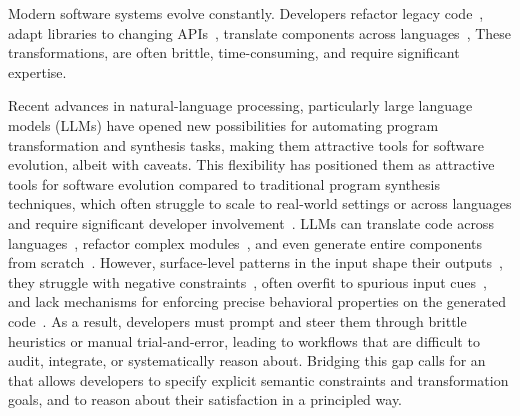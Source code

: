 \documentclass[sigplan,review,anonymous,10pt]{acmart}
\begin{document}



Modern software systems evolve constantly.
Developers refactor legacy code~\cite{Fowler99,Mens04,facebook2010redesigns,dropbox2014syncengine},
adapt libraries to changing APIs~\cite{dig2005role,kula2017empiricalstudyimpactrefactoring},
translate components across languages~\cite{manzoor_cli_python,gaultier_rewrite_cpp},
These transformations, are often brittle, time-consuming, and require significant expertise.

Recent advances in natural-language processing, particularly large language
models (LLMs) have opened new possibilities for automating program
transformation and synthesis tasks,
making them attractive tools for software
evolution, albeit with caveats.
This flexibility has positioned them as attractive tools for software evolution
compared to traditional program synthesis techniques, which often struggle
to scale to real-world settings or across languages and require significant developer involvement~\cite{reynolds2019syguscomp,leino2016dafny,wu2023programming,dynamoth2016,cambronero2019active}.
LLMs can translate code across languages~\cite{ou2025enhancingllmbasedcodetranslation},
refactor complex modules~\cite{ziftci2025migrating},
and even generate entire components from scratch~\cite{huynh2025largelanguagemodelscode}.
However, surface-level patterns in the input shape their outputs~\cite{yang2025evaluatinggeneralizationcapabilitieslarge},
they struggle with negative constraints~\cite{hwang2024thinkpinkelephant,jiang2024llmsdreamelephantswhen},
often overfit to spurious input cues~\cite{xu2023llmfoolitselfpromptbased, wu2023deceptpromptexploitingllmdrivencode},
and lack mechanisms for enforcing precise behavioral properties on the generated code~\cite{roh2025breakthechainreasoningfailuresllms}.
As a result, developers must prompt and steer them through brittle heuristics or manual trial-and-error, leading to workflows that are difficult to audit, integrate, or systematically reason about.
Bridging this gap calls for an that allows developers to specify explicit semantic constraints and transformation goals, and to reason about their satisfaction in a principled way.
\end{document}
